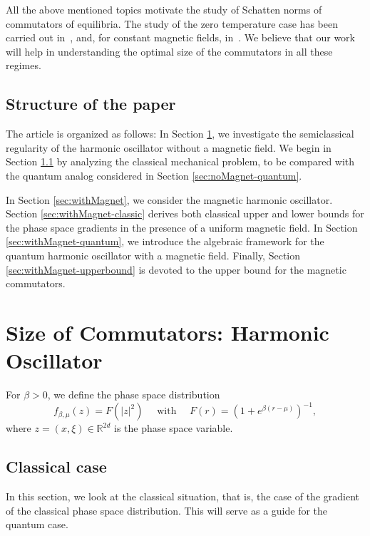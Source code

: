 \documentclass[11pt]{amsart}
\theoremstyle{plain}
\theoremstyle{definition}
\newcommand		{\RR}		{\mathbb R}			%
\newcommand		{\R}		{\RR}
\newcommand		{\Rdd}		{\R^{2d}}
\newcommand		{\lt}			{\left}				%
\newcommand		{\rt}			{\right}			%
\renewcommand	{\(}			{\lt(}
\renewcommand	{\)}			{\rt)}
\newcommand		{\n}[1]			{\lt\lvert #1 \rt\rvert}
\begin{document}
    All the above mentioned topics motivate the study of Schatten norms of commutators of equilibria. The study of the zero temperature case has been carried out in~\cite{fournais_optimal_2020, benedikter_effective_2022, lafleche_optimal_2024, cardenas_commutator_2025}, and, for constant magnetic fields, in~\cite{benedikter_derivation_2025}. We believe that our work will help in understanding the optimal size of the commutators in all these regimes.

\subsection{Structure of the paper}

    The article is organized as follows:
	In Section \ref{sec:noMagnet}, we investigate the semiclassical regularity of the harmonic oscillator without a magnetic field. 
    We begin in Section \ref{sec:noMagnet-classic} by analyzing the classical mechanical problem, to be compared with the quantum analog considered in Section \ref{sec:noMagnet-quantum}.
    
	In Section \ref{sec:withMagnet}, we consider the magnetic harmonic oscillator. 
    Section \ref{sec:withMagnet-classic} derives both classical upper and lower bounds for the phase space gradients in the presence of a uniform magnetic field. 
    In Section \ref{sec:withMagnet-quantum}, we introduce the algebraic framework for the quantum harmonic oscillator with a magnetic field. Finally, Section \ref{sec:withMagnet-upperbound} is devoted to the upper bound for the magnetic commutators.

\bigskip
\section{Size of Commutators: Harmonic Oscillator}\label{sec:noMagnet}

	For $\beta>0$, we define the phase space distribution
	\begin{equation}\label{eq:def_f_and_F}
		f_{\beta,\mu}(z) = F(\n{z}^2) \quad \text{ with }\quad  F(r) = (1+e^{\beta\lt(r-\mu\rt)})^{-1},
	\end{equation}
	where $z=(x,\xi) \in \Rdd$ is the phase space variable.

\subsection{Classical case}\label{sec:noMagnet-classic}

	In this section, we look at the classical situation, that is, the case of the gradient of the classical phase space distribution. This will serve as a guide for the quantum case.
	
\end{document}
